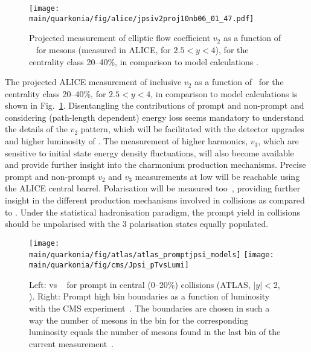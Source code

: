 \documentclass[../report.tex]{subfiles}
\providecommand{\main}{..}
\begin{document}
  
\begin{figure}[h]
\begin{center}
 \texttt{[image: \\main/quarkonia/fig/alice/jpsiv2proj10nb06\_01\_47.pdf]}
\end{center}
 \caption{Projected measurement of elliptic flow coefficient $v_2$ as a function of \pT~ for \PJgy mesons (measured in ALICE, for $2.5<y<4$), for the centrality class 20--40\%, in comparison to model calculations \cite{Du:2015wha}.}
\label{FigQ:v2pTPbPb}
\end{figure}

The projected ALICE measurement of inclusive \PJgy $v_2$ as a function of \pT\ for the centrality class 20--40\%, for $2.5<y<4$, in comparison to model calculations \cite{Du:2015wha} is shown in Fig.~\ref{FigQ:v2pTPbPb}. 
Disentangling the contributions of prompt and non-prompt \PJgy and considering (path-length dependent) energy loss seems mandatory to understand the details of the \PJgy $v_2$ pattern, which will be facilitated with the detector upgrades and higher luminosity of \RunsThreeFour.
The measurement of higher harmonics, \eg $v_3$, which are sensitive to initial state energy density fluctuations, will also become available
and  provide further insight into the charmonium production mechanisms. Precise prompt and non-prompt \PJgy $v_2$ and $v_3$ measurements
at low \pt will be reachable using the ALICE central barrel. Polarisation will be measured too~\cite{Abelevetal:2014cna}, providing further insight in the different production mechanisms involved in \PbPb collisions as compared to \pp. Under the statistical hadronisation paradigm, the prompt \PJgy yield in \PbPb collisions should be unpolarised with the 3 polarisation states equally populated.

\begin{figure}[h]
\begin{center}
 \texttt{[image: \\main/quarkonia/fig/atlas/atlas\_promptjpsi\_models]}
 \texttt{[image: \\main/quarkonia/fig/cms/Jpsi\_pTvsLumi]}
\end{center}
\caption{Left: \RAA vs \pT~ for prompt \PJgy in central (0--20\%) collisions (ATLAS, $|y|<2$, \cite{Aaboud:2018quy}). Right: Prompt \PJgy high \pt bin boundaries as a function of luminosity with the CMS experiment~\cite{CMS-PAS-FTR-18-024}. The boundaries are chosen in such a way the number of mesons in the bin for the corresponding luminosity equals the number of mesons found in the last \pt bin of the current measurement~\cite{Sirunyan:2017isk}.
}
\label{FigQ:JpTPbPb}
\end{figure}
\end{document}
